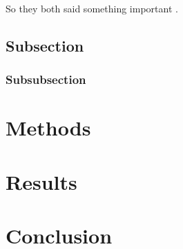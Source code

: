 So they both said something important \cite{dirac,einstein}.

\subsection{Subsection}
\subsubsection{Subsubsection}



\section{Methods}
\section{Results}
\section{Conclusion}




















\printbibliography












